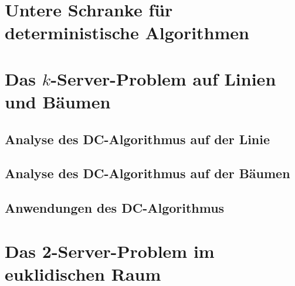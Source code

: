 \section{Untere Schranke für deterministische Algorithmen}


\section{Das $k$-Server-Problem auf Linien und Bäumen}

\subsection{Analyse des DC-Algorithmus auf der Linie}

\subsection{Analyse des DC-Algorithmus auf der Bäumen}

\subsection{Anwendungen des DC-Algorithmus}


\section{Das 2-Server-Problem im euklidischen Raum}
